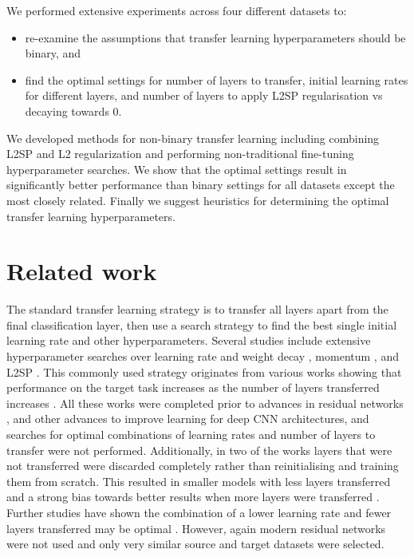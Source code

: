 \documentclass[]{article}
\begin{document}
We performed extensive experiments across four different datasets
to: 
\begin{itemize}
\item re-examine the assumptions that transfer learning hyperparameters should be binary, and 
\item find the optimal settings for number of layers to transfer, initial
learning rates for different layers, and number of layers to apply
L2SP regularisation vs decaying towards 0. 
\end{itemize}
We developed methods for non-binary transfer learning including combining
L2SP and L2 regularization and performing non-traditional fine-tuning
hyperparameter searches. We show that the optimal settings result
in significantly better performance than binary settings for all datasets except the most closely related. Finally we suggest heuristics for determining the optimal transfer learning hyperparameters.

\section{Related work}


The standard
transfer learning strategy is to transfer all layers apart from the
final classification layer, then use a search strategy to find the
best single initial learning rate and other hyperparameters. Several
studies include extensive hyperparameter searches over learning rate
and weight decay \cite{kornblith2019better,mahajan2018exploring},
momentum \cite{li2020rethinking}, and L2SP \cite{li2018explicit}.
This commonly used strategy originates from various works showing
that performance on the target task increases as the number of layers
transferred increases \cite{yosinski2014transferable,chu2016best,agrawal2014analyzing,azizpour2015factors}.
All these works were completed prior to advances in residual
networks \cite{he2016deep}, and other advances to improve learning for deep CNN architectures, and searches for optimal combinations of learning rates and number of layers to transfer were not performed.
Additionally, in two of the works layers that were not transferred
were discarded completely rather than reinitialising and training
them from scratch. This resulted in smaller models with less layers
transferred and a strong bias towards better results when more layers
were transferred \cite{agrawal2014analyzing,azizpour2015factors}.
Further studies have shown the combination of a lower learning rate
and fewer layers transferred may be optimal \cite{plested2019analysis}.
However, again modern residual networks were not used and only very
similar source and target datasets were selected.
\end{document}
